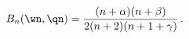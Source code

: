 \begin{equation}
B_n(\wn,\qn) =  {(n+\alpha)(n+\beta)\over 2(n+2)(n+1+\gamma)}\,.
\label{bdef}
\end{equation}

